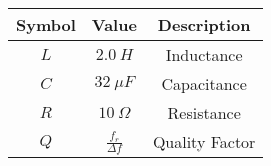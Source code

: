 

\begin{tabular}{|c|c|c|}
    \hline
     \textbf{Symbol} & \textbf{Value} &
     \textbf{Description}\\
    \hline
     $L$ &  $2.0\ H$ & Inductance\\
    \hline 
     $C$ &  $32\ \mu F$ & Capacitance \\
    \hline
     $R$ &  $10\ \Omega$ & Resistance\\
    \hline
     $Q$ & $\frac{f_r}{\Delta f}$ & Quality Factor\\[6pt]
    \hline
\end{tabular}
